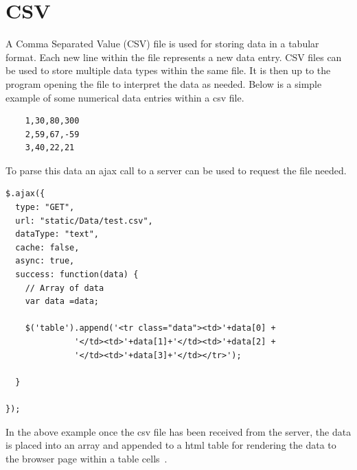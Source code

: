 \section{CSV}
A Comma Separated Value (CSV) file is used for storing data in a tabular format. Each new line within the file represents a new data entry. CSV files can be used to store multiple data types within the same file. It is then up to the program opening the file to interpret the data as needed. Below is a simple example of some numerical data entries within a csv file.~\cite{CSVPython:online} 

\begin{verbatim}
	1,30,80,300
	2,59,67,-59
	3,40,22,21
\end{verbatim}

To parse this data an ajax call to a server can be used to request the file needed.~\cite{ParsingCSVExample:online}
\begin{verbatim}
$.ajax({
  type: "GET",
  url: "static/Data/test.csv",
  dataType: "text",
  cache: false,
  async: true,
  success: function(data) {
    // Array of data
    var data =data;

    $('table').append('<tr class="data"><td>'+data[0] + 
              '</td><td>'+data[1]+'</td><td>'+data[2] +
              '</td><td>'+data[3]+'</td></tr>');

  }

});
\end{verbatim}
In the above example once the csv file has been received from the server, the data is placed into an array and appended to a html table for rendering the data to the browser page within a table cells~\cite{ParsingCSVExample:online}.
